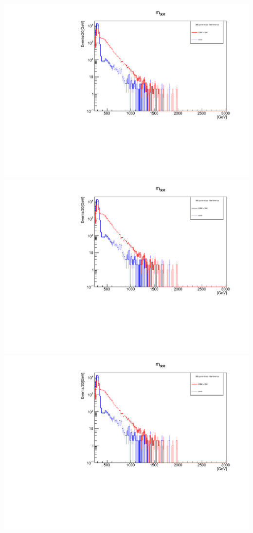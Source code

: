 \documentclass[a4wide,10pt]{article}
\begin{document}
\includegraphics[scale=0.50,page=1]{InterferencePlots05p.pdf}
\includegraphics[scale=0.50,page=2]{InterferencePlots05p.pdf}
\includegraphics[scale=0.50,page=3]{InterferencePlots05p.pdf}
\end{document}
